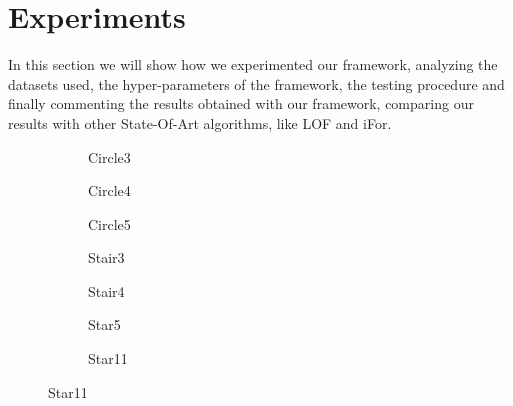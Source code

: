 \chapter{Experiments}
\label{ch:experiments}
In this section we will show how we experimented our framework, analyzing the datasets used, the hyper-parameters of the framework, the testing procedure and finally commenting the results obtained with our framework, comparing our results with other State-Of-Art algorithms, like LOF and iFor.

\begin{figure}[htb]
     \centering
     \begin{subfigure}{0.17\textwidth}
         \centering
        
         \caption{Circle3}
         \label{subfig:circle3}
     \end{subfigure}
     \hfill
     \begin{subfigure}{0.17\textwidth}
         \centering
        
         \caption{Circle4}
         \label{subfig:circle4}
     \end{subfigure}
     \hfill
     \begin{subfigure}{0.17\textwidth}
         \centering
        
         \caption{Circle5}
         \label{subfig:circle5}
     \end{subfigure}
     \hfill
     \begin{subfigure}{0.17\textwidth}
         \centering
        
         \caption{Stair3}
         \label{subfig:stair3}
     \end{subfigure}
     \hfill
     \begin{subfigure}{0.17\textwidth}
         \centering
        
         \caption{Stair4}
         \label{subfig:stair4}
     \end{subfigure}
     \hfill
     \begin{subfigure}{0.17\textwidth}
         \centering
        
         \caption{Star5}
         \label{subfig:star5}
     \end{subfigure}
     \hfill
     \begin{subfigure}{0.17\textwidth}
         \centering
        
         \caption{Star11}

\end{subfigure}
\end{figure}
